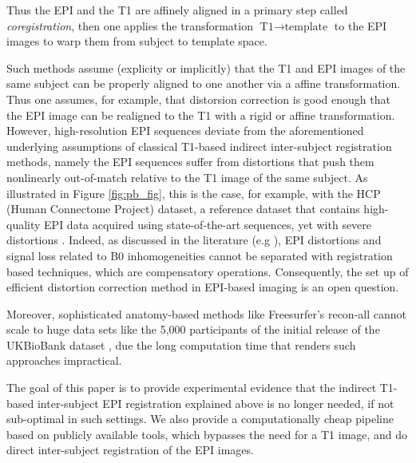 Thus the EPI and the T1 are affinely aligned in a primary step called
\textit{coregistration}, then one applies the transformation $\text{T1}
\rightarrow \text{template}$ to the EPI images to warp them from subject to
template space. %

Such methods assume (explicity or implicitly) that the T1 and EPI images
of the same subject can be properly aligned to one another via a affine transformation.
Thus one assumes, for example, that distorsion correction is
good enough that the EPI image can be realigned to the T1 with a rigid or affine
transformation. However, high-resolution EPI sequences deviate from the
aforementioned underlying assumptions of classical T1-based indirect inter-subject
registration methods, namely the EPI sequences suffer from distortions
that push them nonlinearly out-of-match relative to the T1 image of
the same subject. 
%
As illustrated in Figure \ref{fig:pb_fig}, this is the case, for
example, with the HCP (Human Connectome Project)
\cite{VanEssen20122222} dataset, a reference dataset that contains
high-quality EPI data acquired using state-of-the-art sequences, yet
with severe distortions
\cite{pmid9178246,pmid12270226,zeng2002,anderson2003}.
%
Indeed, as discussed in the literature (e.g \cite{pmid12071618}), EPI
distortions and signal loss related to B0 inhomogeneities cannot be
separated with registration based techniques, which are compensatory
operations.  Consequently, the set up of efficient distortion
correction method in EPI-based imaging is an open question.

Moreover, sophisticated anatomy-based methods like Freesurfer's
recon-all cannot scale to huge data sets like the 5,000 participants
of the initial release of the UKBioBank dataset \cite{Miller2016}, due
the long computation time 
%
that renders such approaches impractical.

The goal of this paper is to provide experimental evidence that the
indirect T1-based inter-subject EPI registration explained above is no
longer needed, if not sub-optimal in such settings. We also provide a
computationally cheap pipeline based on publicly available tools,
which bypasses the need for a T1 image, and do direct inter-subject
registration of the EPI images.

